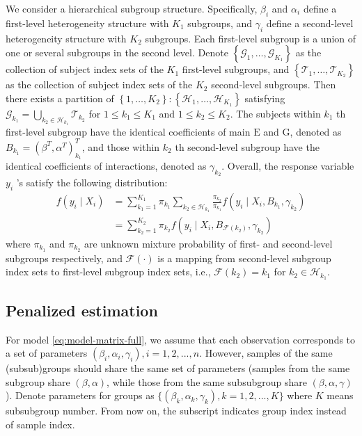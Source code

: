 \documentclass[12pt, a4paper, oneside]{article}
\numberwithin{equation}{section}
\begin{document}
\vspace{0.5cm}
We consider a hierarchical subgroup structure. Specifically, $\beta_{i}$ and $\alpha_i$ define a first-level heterogeneity structure with $K_{1}$ subgroups, and $\gamma_{i}$ define a second-level heterogeneity structure with $K_{2}$ subgroups. Each first-level subgroup is a union of one or several subgroups in the second level. Denote $\left\{\mathcal{G}_{1}, \ldots, \mathcal{G}_{K_{1}}\right\}$ as the collection of subject index sets of the $K_{1}$ first-level subgroups, and $\left\{\mathcal{T}_{1}, \ldots, \mathcal{T}_{K_{2}}\right\}$ as the collection of subject index sets of the $K_{2}$ second-level subgroups. Then there exists a partition of $\left\{1, \ldots, K_{2}\right\}:\left\{\mathcal{H}_{1}, \ldots, \mathcal{H}_{K_{1}}\right\}$ satisfying $\mathcal{G}_{k_{1}}=\bigcup_{k_{2} \in \mathcal{H}_{k_{1}}} \mathcal{T}_{k_{2}}$ for $1 \leq k_{1} \leq K_{1}$ and $1 \leq k_{2} \leq K_{2}$. The subjects within $k_{1}$ th first-level subgroup have the identical coefficients of main $\mathrm{E}$ and $\mathrm{G}$, denoted as $B_{k_1} = (\beta^T, \alpha^T)^T_{k_1}$, and those within $k_{2}$ th second-level subgroup have the identical coefficients of interactions, denoted as $\gamma_{k_{2}}$. Overall, the response variable $y_{i}$ 's satisfy the following distribution:
\begin{equation}
\begin{aligned}
	f\left(y_{i} \mid X_{i}\right) &=\sum_{k_{1}=1}^{K_{1}} \pi_{k_{1}} \sum_{k_{2} \in \mathcal{H}_{k_{1}}} \frac{\pi_{k_{2}}}{\pi_{k_{1}}} f\left(y_{i} \mid X_{i}, B_{k_{1}}, \gamma_{k_{2}}\right) \\
	&=\sum_{k_{2}=1}^{K_{2}} \pi_{k_{2}} f\left(y_{i} \mid X_{i}, B_{\mathcal{F}\left(k_{2}\right)}, \gamma_{k_{2}}\right)
\end{aligned}
\end{equation}
where $\pi_{k_{1}}$ and $\pi_{k_{2}}$ are unknown mixture probability of first- and second-level subgroups respectively, and $\mathcal{F}(\cdot)$ is a mapping from second-level subgroup index sets to first-level subgroup index sets, i.e., $\mathcal{F}\left(k_{2}\right)=k_{1}$ for $k_{2} \in \mathcal{H}_{k_{1}}$.

\subsection{Penalized estimation}
\label{subsec:penalty}

For model \ref{eq:model-matrix-full}, we assume that each observation corresponds to a set of parameters $(\beta_i, \alpha_i, \gamma_i), i =1,2,...,n$. However, samples of the same (subsub)groups should share the same set of parameters (samples from the same subgroup share $(\beta, \alpha)$, while those from the same subsubgroup share $(\beta, \alpha, \gamma)$). Denote parameters for groups as $\{(\beta_k, \alpha_k, \gamma_k), k = 1, 2, ..., K\}$ where $K$ means subsubgroup number. From now on, the subscript indicates group index instead of sample index.
\end{document}

